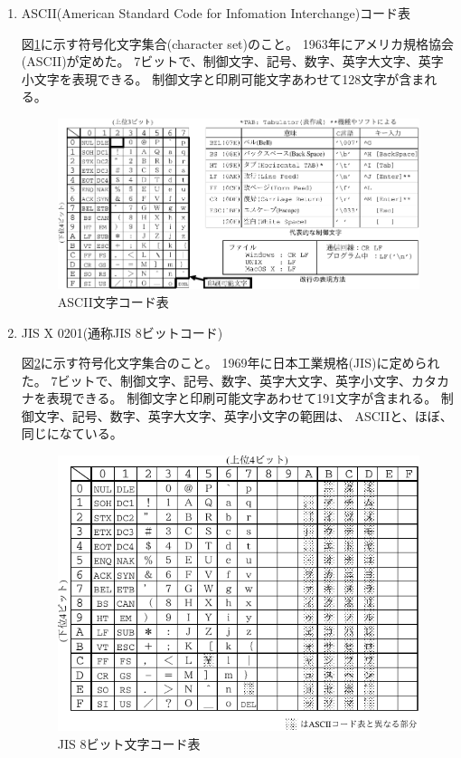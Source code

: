 \documentclass[uplatex,a4j,dvipdfmx]{ujarticle}
\begin{document}
\begin{enumerate}
\begin{enumerate}
\item ASCII(American Standard Code for Infomation Interchange)コード表

図\ref{fig2}に示す符号化文字集合(character set)のこと。
1963年にアメリカ規格協会(ASCII)が定めた。
7ビットで、制御文字、記号、数字、英字大文字、英字小文字を表現できる。
制御文字と印刷可能文字あわせて128文字が含まれる。

\begin{figure}[hbtp]
\begin{center}
\includegraphics[scale=0.9]{ascii.pdf}
\caption{ASCII文字コード表}
\label{fig2}
\end{center}
\end{figure}

\item JIS X 0201(通称JIS 8ビットコード)

図\ref{fig3}に示す符号化文字集合のこと。
1969年に日本工業規格(JIS)に定められた。
7ビットで、制御文字、記号、数字、英字大文字、英字小文字、カタカナを表現できる。
制御文字と印刷可能文字あわせて191文字が含まれる。
制御文字、記号、数字、英字大文字、英字小文字の範囲は、
ASCIIと、ほぼ、同じになている。

\begin{figure}[hbtp]
\begin{center}
\includegraphics[scale=0.9]{jisx0201.pdf}
\caption{JIS 8ビット文字コード表}
\label{fig3}
\end{center}
\end{figure}


\end{enumerate}
\end{enumerate}
\end{document}
